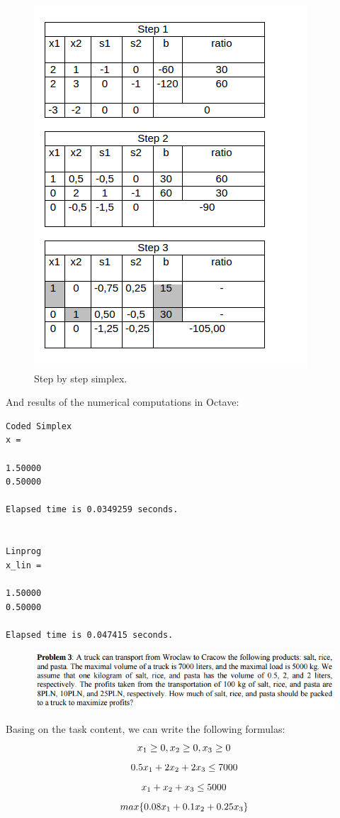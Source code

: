\documentclass[eng,openany]{mgr}
\begin{document}
\newpage
\begin{figure}[h]
\centering
\includegraphics[width=0.4\linewidth]{screenshot007}
\caption{Step by step simplex.}
\label{fig:screenshot007}
\end{figure}

And results of the numerical computations in Octave:

\begin{lstlisting}
Coded Simplex
x =

1.50000
0.50000

Elapsed time is 0.0349259 seconds.


Linprog
x_lin =

1.50000
0.50000

Elapsed time is 0.047415 seconds.
\end{lstlisting}

\newpage
\begin{figure}[h]
\centering
\includegraphics[width=0.7\linewidth]{screenshot008}
\label{fig:screenshot008}
\end{figure}
Basing on the task content, we can write the following formulas:\\
\begin{equation*}
x_1 \geq 0, x_2\geq 0, x_3\geq 0\\
\end{equation*}
\begin{equation*}
0.5x_1 + 2x_2 + 2x_3 \leq 7000\\
\end{equation*}
\begin{equation*}
x_1 + x_2 + x_3 \leq 5000\\
\end{equation*}
\begin{equation*}
max\{0.08x_1+0.1x_2+0.25x_3\}\\
\end{equation*}
\end{document}
